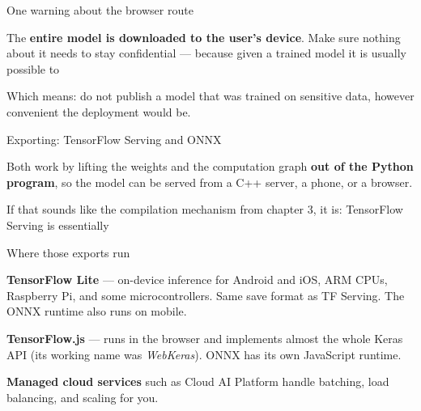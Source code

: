 \documentclass[aspectratio=169,11pt,t]{beamer}
\begin{document}
\begin{frame}[shrink=25]{One warning about the browser route}
\begin{iband}[rose]
The \textbf{entire model is downloaded to the user's device}. Make sure nothing about it needs to stay confidential --- because given a trained model it is usually possible to 
\end{iband}
{\fontsize{9.4}{12.6}\selectfont\color{fg2}Which means: do not publish a model that was trained on sensitive data, however convenient the deployment would be.\par}\vskip 4pt
\end{frame}

\begin{frame}[shrink=25]{Exporting: TensorFlow Serving and ONNX}
{\fontsize{9.4}{12.6}\selectfont\color{fg2}Both work by lifting the weights and the computation graph \textbf{out of the Python program}, so the model can be served from a C++ server, a phone, or a browser.\par}\vskip 4pt
\begin{minipage}[t]{0.485\textwidth}

\end{minipage}%
\hfill
\begin{minipage}[t]{0.485\textwidth}

\end{minipage}%
\begin{iband}[signal]
If that sounds like the compilation mechanism from chapter 3, it is: TensorFlow Serving is essentially 
\end{iband}
\end{frame}

\begin{frame}[shrink=25]{Where those exports run}
\begin{ibullets}
\item \textbf{TensorFlow Lite} --- on-device inference for Android and iOS, ARM CPUs, Raspberry Pi, and some microcontrollers. Same save format as TF Serving. The ONNX runtime also runs on mobile.
\item \textbf{TensorFlow.js} --- runs in the browser and implements almost the whole Keras API (its working name was \textit{WebKeras}). ONNX has its own JavaScript runtime.
\item \textbf{Managed cloud services} such as Cloud AI Platform handle batching, load balancing, and scaling for you.
\end{ibullets}
\end{frame}
\end{document}
